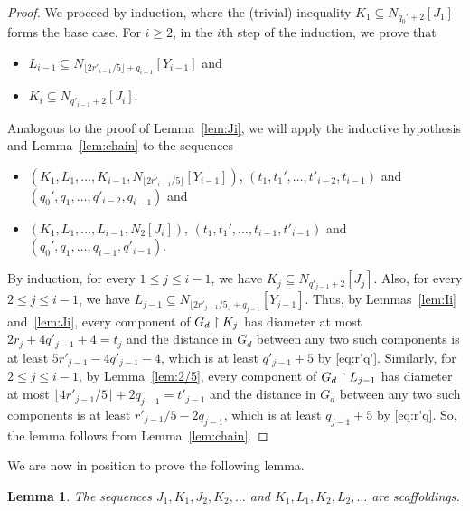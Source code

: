 \documentclass[12pt,a4paper]{amsart}
\numberwithin{equation}{section}
\newtheorem{lemma}[equation]{Lemma}
\theoremstyle{definition}
\begin{document}
\begin{proof}
We proceed by induction, where the (trivial) inequality $K_1\subseteq N_{q_0'+2}[J_1]$ forms the base case. For $i\geq2$, in the $i$th step of the induction, we prove that 
\begin{itemize}
\item $L_{i-1}\subseteq N_{\lfloor 2r'_{i-1}/5\rfloor+q_{i-1}}[Y_{i-1}]$ and
\item $K_i\subseteq N_{q'_{i-1}+2}[J_i]$. 
\end{itemize}
Analogous to the proof of Lemma~\ref{lem:Ji}, we will apply the inductive hypothesis and Lemma~\ref{lem:chain} to the sequences 
\begin{itemize}
\item $(K_1,L_1,\dots,K_{i-1},N_{\lfloor 2r'_{i-1}/5\rfloor}[Y_{i-1}])$, $(t_1,t_1',\dots,t'_{i-2},t_{i-1})$ and $(q_0',q_1,\dots,q'_{i-2},q_{i-1})$ and
\item $(K_1,L_1,\dots,L_{i-1},N_2[J_i])$, $(t_1,t_1',\dots,t_{i-1},t'_{i-1})$ and $(q_0',q_1,\dots,q_{i-1},q'_{i-1})$.
\end{itemize}

By induction, for every $1\leq j\leq i-1$, we have $K_j\subseteq N_{q'_{j-1}+2}[J_j]$. Also, for every $2\leq j\leq i-1$, we have $L_{j-1}\subseteq N_{\lfloor 2r'_{j-1}/5\rfloor + q_{j-1}}[Y_{j-1}]$. Thus, by Lemmas~\ref{lem:Ii} and~\ref{lem:Ji}, every component of $G_d\upharpoonright K_j$ has diameter at most $2r_j+4q'_{j-1}+4=t_j$ and the distance in $G_d$ between any two such components is at least $5r'_{j-1}-4q'_{j-1}-4$, which is at least $q'_{j-1}+5$ by \eqref{eq:r'q'}. Similarly, for $2\leq j\leq i-1$, by Lemma~\ref{lem:2/5}, every component of $G_d\upharpoonright L_{j-1}$ has diameter at most $\lfloor 4r'_{j-1}/5\rfloor+2q_{j-1}=t'_{j-1}$ and the distance in $G_d$ between any two such components is at least $r'_{j-1}/5-2q_{j-1}$, which is at least $q_{j-1}+5$ by \eqref{eq:r'q}. So, the lemma follows from Lemma~\ref{lem:chain}.
\end{proof}

We are now in position to prove the following lemma.

\begin{lemma}
\label{lem:JKLscaff}
The sequences $J_1,K_1,J_2,K_2,\dots$ and $K_1,L_1,K_2,L_2,\dots$ are scaffoldings.
\end{lemma}
\end{document}
